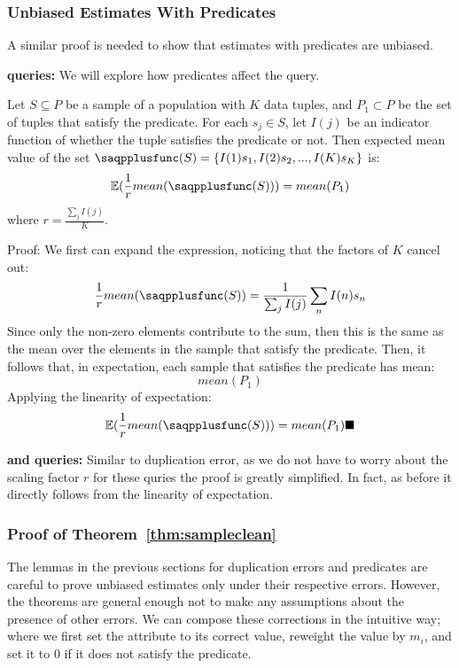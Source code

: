 \subsubsection{Unbiased Estimates With Predicates}\label{app:proof2}
A similar proof is needed to show that estimates with predicates are unbiased.

{\noindent \bf \avgfunc queries:}
We will explore how predicates affect the \avgfunc query.
\begin{lemma}
Let $S \subseteq P$ be a sample of a population with $K$ data tuples, and $P_{1}\subset P$ be the set of tuples that satisfy the predicate.
For each $s_{j}\in S$, let $I(j)$ be an indicator function of whether the tuple satisfies the predicate or not.
Then expected mean value of the set $\saqpplusfunc(S)=\{I(1)s_1,I(2)s_2,...,I(K)s_K \}$ is:
\[
\mathbb{E}(\frac{1}{r}mean(\saqpplusfunc(S)))= mean(P_{1})
\]
where $r = \frac{\sum_j I(j)}{K}$.
\end{lemma}
Proof: We first can expand the expression, noticing that the factors of $K$ cancel out:
\[\frac{1}{r}mean(\saqpplusfunc(S)) = \frac{1}{\sum_j I(j)}\sum_n I(n)s_n \]
Since only the non-zero elements contribute to the sum, then this is the same as the mean over the elements in
the sample that satisfy the predicate.
Then, it follows that, in expectation, each sample that satisfies the predicate has mean:
\[ mean(P_{1})\]
Applying the linearity of expectation:
\[
\mathbb{E}(\frac{1}{r}mean(\saqpplusfunc(S)))= mean(P_{1})\blacksquare
\]

{\noindent \bf \sumfunc and \countfunc queries:}
Similar to duplication error, as we do not have to worry about the scaling factor $r$ for these quries the proof is greatly simplified.
In fact, as before it directly follows from the linearity of expectation.



\subsubsection{Proof of Theorem~\ref{thm:sampleclean}}\label{app:proof3}
The lemmas in the previous sections for duplication errors and predicates are careful to prove unbiased estimates only under their respective errors.
However, the theorems are general enough not to make any assumptions about the presence of other errors.
We can compose these corrections in the intuitive way; where we first set the attribute to its correct value, reweight the value by $m_i$, and set it to $0$ if it does not satisfy the predicate.


